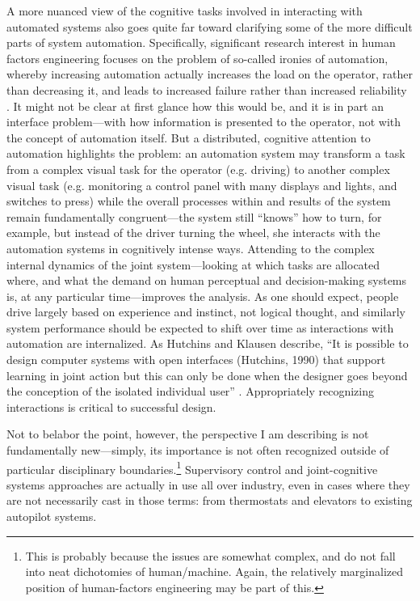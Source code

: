 A more nuanced view of the cognitive tasks involved in interacting
with automated systems also goes quite far toward clarifying some
of the more difficult parts of system automation. Specifically,
significant research interest in human factors engineering focuses on
the problem of so-called ironies of automation, whereby increasing
automation actually 
increases the load on the operator, rather than decreasing it, and
leads to increased failure rather than increased
reliability \cite{parasuramanW}. It might
not be clear at first glance how this would be, and it is in part an
interface problem---with how information is presented to the operator,
not with the concept of automation itself. But a distributed,
cognitive attention to automation highlights the problem:  an
automation system may transform a task from a complex visual task for the
operator (e.g. driving) to another complex visual task (e.g. monitoring a control
panel with many displays and lights, and switches to press) while the
overall processes within and results of the system remain
fundamentally congruent---the system still ``knows'' how to turn, for
example, but instead of the driver turning the wheel, she interacts
with the automation systems in cognitively intense ways. Attending to
the complex internal dynamics of
the joint system---looking at which tasks are
allocated where, and what the demand on human perceptual and
decision-making systems is, at any particular time---improves the
analysis. As one should expect, 
people drive largely based on experience and
instinct, \cite{knaptonDriverless} not logical 
thought, and similarly system performance should be expected to shift
over time as interactions with automation are internalized. As
Hutchins and Klausen describe, ``It is possible to design computer systems with open
interfaces (Hutchins, 1990) that support learning in joint action but
this can only be done when the designer goes beyond the conception of
the isolated individual user'' \cite[p. 13]{hutchinsKlausen}.
Appropriately recognizing interactions is critical to successful design.

Not to belabor the point, however, the perspective I am describing is
not fundamentally new---simply, its importance is not often
recognized outside of particular disciplinary
boundaries.\footnote{This is probably because the issues are
  somewhat complex, and do not fall into neat dichotomies of
  human/machine. Again, the relatively marginalized position of
  human-factors engineering may be part of this.} Supervisory control and 
joint-cognitive systems approaches are actually in use all over
industry, even in cases where they are not necessarily cast in
those terms: from thermostats and elevators to existing autopilot systems.

